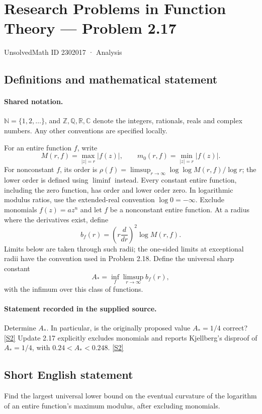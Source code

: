 \documentclass[11pt]{article}
\newcommand{\sref}[2]{\hyperlink{source:#1:#2}{[S#2]}}
\begin{document}
\setcounter{section}{2302016}
\section{Research Problems in Function Theory — Problem 2.17}\label{2302017}
{\small\sffamily UnsolvedMath ID 2302017 · Analysis}
\subsection{Definitions and mathematical statement}

\paragraph{Shared notation.}$\mathbb N=\{1,2,\ldots\}$, and $\mathbb Z,\mathbb Q,\mathbb R,\mathbb C$ denote the integers, rationals, reals and complex numbers. Any other conventions are specified locally.


For an entire function $f$, write
\[
 M(r,f)=\max_{|z|=r}|f(z)|,\qquad m_0(r,f)=\min_{|z|=r}|f(z)|.
\]
For nonconstant $f$, its order is $\rho(f)=\limsup_{r\to\infty}\log\log M(r,f)/\log r$;
the lower order is defined using $\liminf$ instead. Every constant entire function, including the zero function, has order and lower order zero. In logarithmic modulus ratios, use the extended-real convention $\log0=-\infty$.
Exclude monomials $f(z)=az^n$ and let $f$ be a nonconstant entire function. At a radius where the derivatives exist, define
\[b_f(r)=\left(r\frac{d}{dr}\right)^2\log M(r,f).
\]
Limits below are taken through such radii; the one-sided limits at exceptional radii have the convention used in Problem 2.18.
Define the universal sharp constant
\[A_* = \inf_f\limsup_{r\to\infty}b_f(r),\]
with the infimum over this class of functions.

\paragraph{Statement recorded in the supplied source.}
Determine $A_*$. In particular, is the originally proposed value $A_*=1/4$ correct? \sref{2302017}{2}
Update 2.17 explicitly excludes monomials and reports Kjellberg's disproof of $A_*=1/4$, with $0.24<A_*<0.248$. \sref{2302017}{2}
\subsection{Short English statement}
Find the largest universal lower bound on the eventual curvature of the logarithm of an entire function's maximum modulus, after excluding monomials.
\end{document}
